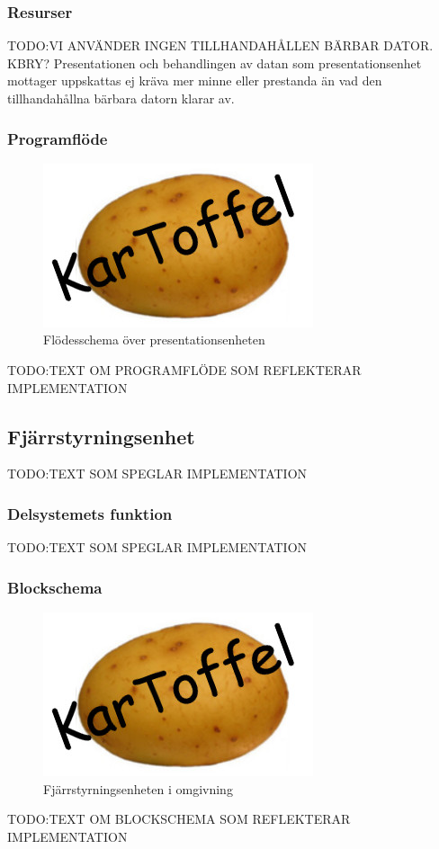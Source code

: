 \documentclass{article}
\begin{document}
\subsubsection{Resurser}
TODO:VI ANVÄNDER INGEN TILLHANDAHÅLLEN BÄRBAR DATOR. KBRY?
Presentationen och behandlingen av datan som presentationsenhet mottager uppskattas ej kräva mer minne eller prestanda än vad den tillhandahållna bärbara datorn klarar av.

\subsubsection{Programflöde}
\begin{figure}[H]
\centering 
\includegraphics[scale=0.3]{Logo}
\caption{Flödesschema över presentationsenheten}
\label{fig:Presentationsenhet3}
\end{figure}

TODO:TEXT OM PROGRAMFLÖDE SOM REFLEKTERAR IMPLEMENTATION

\subsection{Fjärrstyrningsenhet}
TODO:TEXT SOM SPEGLAR IMPLEMENTATION

\subsubsection{Delsystemets funktion}
TODO:TEXT SOM SPEGLAR IMPLEMENTATION

\subsubsection{Blockschema}
\begin{figure}[H]
\centering 
\includegraphics[scale=0.37]{Logo}
\caption{Fjärrstyrningsenheten i omgivning}
\label{fig:Oversikt_fjarrstyrenhet3}
\end{figure}
TODO:TEXT OM BLOCKSCHEMA SOM REFLEKTERAR IMPLEMENTATION
\end{document}
